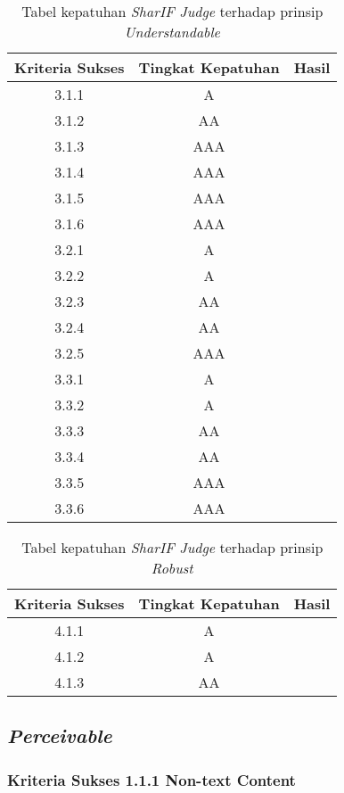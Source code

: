 \begin{table}[H]
	\centering
	\caption{Tabel kepatuhan \textit{SharIF Judge} terhadap prinsip \textit{Understandable}}
	\label{tab:kepatuhan_sharif_judge_understandable}
	\begin{tabular}{|c|c|c|}
		\hline
		Kriteria Sukses & Tingkat Kepatuhan & Hasil \\
		\hline
		3.1.1 & A & \\
		3.1.2 & AA & \\
		3.1.3 & AAA & \\
		3.1.4 & AAA & \\
		3.1.5 & AAA & \\
		3.1.6 & AAA & \\
		3.2.1 & A & \\
		3.2.2 & A & \\
		3.2.3 & AA & \\
		3.2.4 & AA & \\
		3.2.5 & AAA & \\
		3.3.1 & A & \\
		3.3.2 & A & \\
		3.3.3 & AA & \\
		3.3.4 & AA & \\
		3.3.5 & AAA & \\
		3.3.6 & AAA & \\
		\hline
	\end{tabular}
\end{table}

\begin{table}[H]
	\centering
	\caption{Tabel kepatuhan \textit{SharIF Judge} terhadap prinsip \textit{Robust}}
	\label{tab:kepatuhan_sharif_judge_robust}
	\begin{tabular}{|c|c|c|}
		\hline
		Kriteria Sukses & Tingkat Kepatuhan & Hasil \\
		\hline
		4.1.1 & A & \\
		4.1.2 & A & \\
		4.1.3 & AA & \\
		\hline
	\end{tabular}
\end{table}

\subsection{\textit{Perceivable}}
\label{subsec:kepatuhan_perceivable}

\subsubsection{Kriteria Sukses 1.1.1 Non-text Content}
\label{subsubsec:kepatuhan_kriteria_1.1.1}

